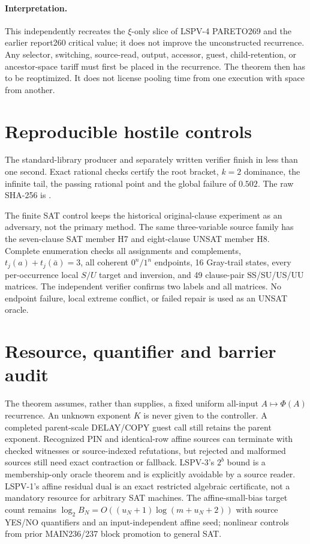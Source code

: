 \documentclass[11pt]{article}
\begin{document}
\paragraph{Interpretation.}
This independently recreates the $\xi$-only slice of LSPV-4 PARETO269 and the
earlier report260 critical value; it does not improve the unconstructed
recurrence.  Any selector, switching, source-read,
output, accessor, guest, child-retention, or ancestor-space tariff must first be
placed in the recurrence.  The theorem then has to be reoptimized.  It does not
license pooling time from one execution with space from another.

\section{Reproducible hostile controls}
The standard-library producer and separately written verifier finish in less
than one second.  Exact rational checks certify the root bracket, $k=2$
dominance, the infinite tail, the passing rational point and the global failure
of $0.502$.  The raw SHA-256 is
.

The finite SAT control keeps the historical original-clause experiment as an
adversary, not the primary method.  The same three-variable source family has
the seven-clause SAT member H7 and eight-clause UNSAT member H8.  Complete
enumeration checks all assignments and complements, $t_j(a)+t_j(\bar a)=3$,
all coherent $0^n/1^n$ endpoints, 16 Gray-trail states, every per-occurrence
local $S/U$ target and inversion, and 49 clause-pair SS/SU/US/UU matrices.
The independent verifier confirms two labels and all matrices.  No endpoint
failure, local extreme conflict, or failed repair is used as an UNSAT oracle.

\section{Resource, quantifier and barrier audit}
The theorem assumes, rather than supplies, a fixed uniform all-input
$A\mapsto\Phi(A)$ recurrence.  An unknown exponent $K$ is never given to the
controller.  A completed parent-scale DELAY/COPY guest call still retains the
parent exponent.  Recognized PIN and identical-row affine sources can terminate
with checked witnesses or source-indexed refutations, but rejected and malformed
sources still need exact contraction or fallback.  LSPV-3's $2^b$ bound is a
membership-only oracle theorem and is explicitly avoidable by a source reader.
LSPV-1's affine residual dual is an exact restricted algebraic certificate, not
a mandatory resource for arbitrary SAT machines.  The affine-small-bias target
count remains
$\log_2 B_N=O((u_N+1)\log(m+u_N+2))$ with source YES/NO quantifiers and an
input-independent affine seed; nonlinear controls from prior MAIN236/237 block
promotion to general SAT.
\end{document}
